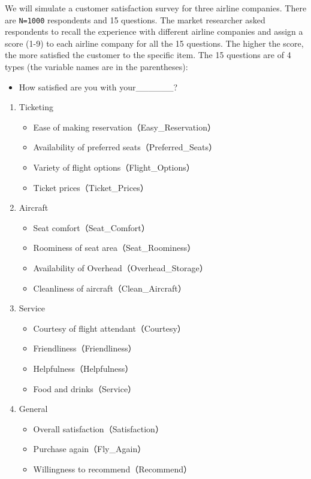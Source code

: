 \documentclass[
]{article}
\providecommand{\tightlist}{%
  \setlength{\itemsep}{0pt}\setlength{\parskip}{0pt}}
\begin{document}
We will simulate a customer satisfaction survey for three airline
companies. There are \texttt{N=1000} respondents and 15 questions. The
market researcher asked respondents to recall the experience with
different airline companies and assign a score (1-9) to each airline
company for all the 15 questions. The higher the score, the more
satisfied the customer to the specific item. The 15 questions are of 4
types (the variable names are in the parentheses):

\begin{itemize}
\tightlist
\item
  How satisfied are you with your\_\_\_\_\_\_?
\end{itemize}

\begin{enumerate}
\def\labelenumi{\arabic{enumi}.}
\tightlist
\item
  Ticketing

  \begin{itemize}
  \tightlist
  \item
    Ease of making reservation（Easy\_Reservation）
  \item
    Availability of preferred seats（Preferred\_Seats）
  \item
    Variety of flight options（Flight\_Options）
  \item
    Ticket prices（Ticket\_Prices）
  \end{itemize}
\item
  Aircraft

  \begin{itemize}
  \tightlist
  \item
    Seat comfort（Seat\_Comfort）
  \item
    Roominess of seat area（Seat\_Roominess）
  \item
    Availability of Overhead（Overhead\_Storage）
  \item
    Cleanliness of aircraft（Clean\_Aircraft）
  \end{itemize}
\item
  Service

  \begin{itemize}
  \tightlist
  \item
    Courtesy of flight attendant（Courtesy）
  \item
    Friendliness（Friendliness）
  \item
    Helpfulness（Helpfulness）
  \item
    Food and drinks（Service）
  \end{itemize}
\item
  General

  \begin{itemize}
  \tightlist
  \item
    Overall satisfaction（Satisfaction）
  \item
    Purchase again（Fly\_Again）
  \item
    Willingness to recommend（Recommend）
  \end{itemize}
\end{enumerate}
\end{document}
